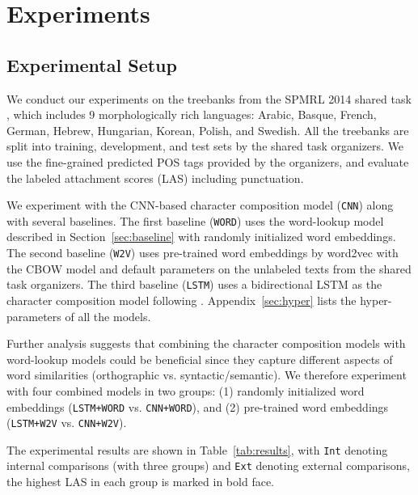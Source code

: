 \documentclass[11pt,a4paper]{article}
\begin{document}
\section{Experiments}


  \subsection{Experimental Setup}
    We conduct our experiments on the treebanks from the SPMRL 2014 shared task \citep{Seddah:2013, Seddah:2014}, which includes 9 morphologically rich languages: Arabic, Basque, French, German, Hebrew, Hungarian, Korean, Polish, and Swedish.
    All the treebanks are split into training, development, and test sets by the shared task organizers.
    We use the fine-grained predicted POS tags provided by the organizers, and evaluate the labeled attachment scores (LAS) including punctuation. 

    We experiment with the CNN-based character composition model (\texttt{CNN}) along with several baselines. The first baseline (\texttt{WORD}) uses the word-lookup model described in Section~\ref{sec:baseline} with randomly initialized word embeddings. The second baseline (\texttt{W2V}) uses pre-trained word embeddings by word2vec \citep{Mikolov:2013} with the CBOW model and default parameters on the unlabeled texts from the shared task organizers. The third baseline (\texttt{LSTM}) uses a bidirectional LSTM as the character composition model following \citet{Ballesteros:2015}.
    Appendix~\ref{sec:hyper} lists the hyper-parameters of all the models.

    Further analysis suggests that combining the character composition models with word-lookup models could be beneficial since they capture different aspects of word similarities (orthographic vs. syntactic/semantic). We therefore experiment with four combined models in two groups: (1) randomly initialized word embeddings (\texttt{LSTM+WORD} vs. \texttt{CNN+WORD}), and (2) pre-trained word embeddings (\texttt{LSTM+W2V} vs. \texttt{CNN+W2V}).



    The experimental results are shown in Table~\ref{tab:results}, with \texttt{Int} denoting internal comparisons (with three groups) and \texttt{Ext} denoting external comparisons, the highest LAS in each group is marked in bold face.
    
\end{document}
